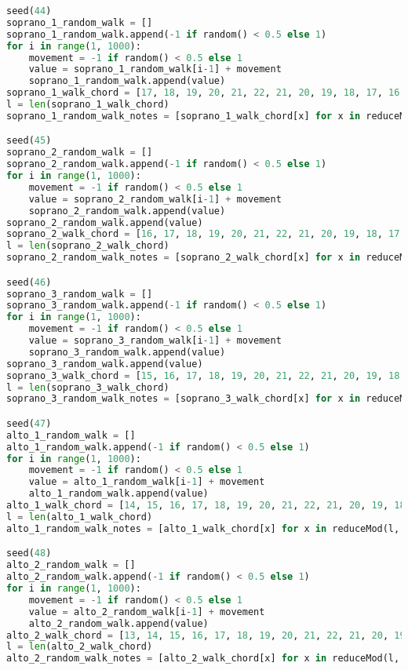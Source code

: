 \begin{lstlisting}[language=Python, caption=Invocation Source Code]
seed(44)
soprano_1_random_walk = []
soprano_1_random_walk.append(-1 if random() < 0.5 else 1)
for i in range(1, 1000):
    movement = -1 if random() < 0.5 else 1
    value = soprano_1_random_walk[i-1] + movement
    soprano_1_random_walk.append(value)
soprano_1_walk_chord = [17, 18, 19, 20, 21, 22, 21, 20, 19, 18, 17, 16, 15, 14, 13, 12, 11, 10, 9, 8, 7, 6, 5, 4, 3, 2, 1, 0, -1, -2, -1, 0, 1, 2, 3, 4, 5, 6, 7, 8, 9, 10, 11, 12, 13, 14, 15, 16, ]
l = len(soprano_1_walk_chord)
soprano_1_random_walk_notes = [soprano_1_walk_chord[x] for x in reduceMod(l, soprano_1_random_walk)]

seed(45)
soprano_2_random_walk = []
soprano_2_random_walk.append(-1 if random() < 0.5 else 1)
for i in range(1, 1000):
    movement = -1 if random() < 0.5 else 1
    value = soprano_2_random_walk[i-1] + movement
    soprano_2_random_walk.append(value)
soprano_2_random_walk.append(value)
soprano_2_walk_chord = [16, 17, 18, 19, 20, 21, 22, 21, 20, 19, 18, 17, 16, 15, 14, 13, 12, 11, 10, 9, 8, 7, 6, 5, 4, 3, 2, 1, 0, -1, -2, -1, 0, 1, 2, 3, 4, 5, 6, 7, 8, 9, 10, 11, 12, 13, 14, 15, ]
l = len(soprano_2_walk_chord)
soprano_2_random_walk_notes = [soprano_2_walk_chord[x] for x in reduceMod(l, soprano_2_random_walk)]

seed(46)
soprano_3_random_walk = []
soprano_3_random_walk.append(-1 if random() < 0.5 else 1)
for i in range(1, 1000):
    movement = -1 if random() < 0.5 else 1
    value = soprano_3_random_walk[i-1] + movement
    soprano_3_random_walk.append(value)
soprano_3_random_walk.append(value)
soprano_3_walk_chord = [15, 16, 17, 18, 19, 20, 21, 22, 21, 20, 19, 18, 17, 16, 15, 14, 13, 12, 11, 10, 9, 8, 7, 6, 5, 4, 3, 2, 1, 0, -1, -2, -1, 0, 1, 2, 3, 4, 5, 6, 7, 8, 9, 10, 11, 12, 13, 14, ]
l = len(soprano_3_walk_chord)
soprano_3_random_walk_notes = [soprano_3_walk_chord[x] for x in reduceMod(l, soprano_3_random_walk)]

seed(47)
alto_1_random_walk = []
alto_1_random_walk.append(-1 if random() < 0.5 else 1)
for i in range(1, 1000):
    movement = -1 if random() < 0.5 else 1
    value = alto_1_random_walk[i-1] + movement
    alto_1_random_walk.append(value)
alto_1_walk_chord = [14, 15, 16, 17, 18, 19, 20, 21, 22, 21, 20, 19, 18, 17, 16, 15, 14, 13, 12, 11, 10, 9, 8, 7, 6, 5, 4, 3, 2, 1, 0, -1, -2, -1, 0, 1, 2, 3, 4, 5, 6, 7, 8, 9, 10, 11, 12, 13, ]
l = len(alto_1_walk_chord)
alto_1_random_walk_notes = [alto_1_walk_chord[x] for x in reduceMod(l, alto_1_random_walk)]

seed(48)
alto_2_random_walk = []
alto_2_random_walk.append(-1 if random() < 0.5 else 1)
for i in range(1, 1000):
    movement = -1 if random() < 0.5 else 1
    value = alto_2_random_walk[i-1] + movement
    alto_2_random_walk.append(value)
alto_2_walk_chord = [13, 14, 15, 16, 17, 18, 19, 20, 21, 22, 21, 20, 19, 18, 17, 16, 15, 14, 13, 12, 11, 10, 9, 8, 7, 6, 5, 4, 3, 2, 1, 0, -1, -2, -1, 0, 1, 2, 3, 4, 5, 6, 7, 8, 9, 10, 11, 12, ]
l = len(alto_2_walk_chord)
alto_2_random_walk_notes = [alto_2_walk_chord[x] for x in reduceMod(l, alto_2_random_walk)]


\end{lstlisting}
